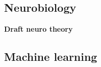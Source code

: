 \subsection{Neurobiology}\label{ssec:neurobiology}
\textbf{Draft neuro theory}




\subsection{Machine learning}\label{ssec:machine_learning}






